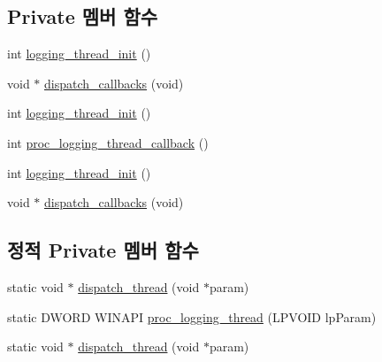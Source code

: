 \subsection*{Private 멤버 함수}
\begin{DoxyCompactItemize}
\item 
int \hyperlink{classavdecc__lib_1_1log__imp_a9e4d651501d193851d1b625d6df7e3ca}{logging\+\_\+thread\+\_\+init} ()
\item 
void $\ast$ \hyperlink{classavdecc__lib_1_1log__imp_a8ffe33a0a5a99f068bc825b91b08fea4}{dispatch\+\_\+callbacks} (void)
\item 
int \hyperlink{classavdecc__lib_1_1log__imp_a9e4d651501d193851d1b625d6df7e3ca}{logging\+\_\+thread\+\_\+init} ()
\item 
int \hyperlink{classavdecc__lib_1_1log__imp_a4008d2a4759a2ae0f066ed96192edb2e}{proc\+\_\+logging\+\_\+thread\+\_\+callback} ()
\item 
int \hyperlink{classavdecc__lib_1_1log__imp_a9e4d651501d193851d1b625d6df7e3ca}{logging\+\_\+thread\+\_\+init} ()
\item 
void $\ast$ \hyperlink{classavdecc__lib_1_1log__imp_a40bd48901576e19c42fa47c0c9ff3185}{dispatch\+\_\+callbacks} (void)
\end{DoxyCompactItemize}
\subsection*{정적 Private 멤버 함수}
\begin{DoxyCompactItemize}
\item 
static void $\ast$ \hyperlink{classavdecc__lib_1_1log__imp_af3a89548f73e42e20e95007b47aef0d1}{dispatch\+\_\+thread} (void $\ast$param)
\item 
static D\+W\+O\+RD W\+I\+N\+A\+PI \hyperlink{classavdecc__lib_1_1log__imp_aa673d3ae2e7e193500ddebd9f60955dd}{proc\+\_\+logging\+\_\+thread} (L\+P\+V\+O\+ID lp\+Param)
\item 
static void $\ast$ \hyperlink{classavdecc__lib_1_1log__imp_a6f9ef2d3ef616fd6b396bc19a5073ac6}{dispatch\+\_\+thread} (void $\ast$param)
\end{DoxyCompactItemize}
